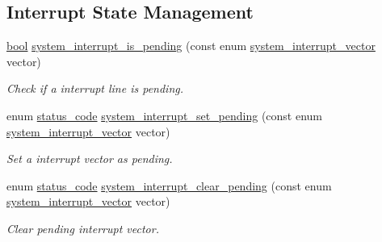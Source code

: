 \subsection*{Interrupt State Management}
\begin{DoxyCompactItemize}
\item 
\mbox{\hyperlink{group__group__sam0__utils_ga97a80ca1602ebf2303258971a2c938e2}{bool}} \mbox{\hyperlink{group__asfdoc__sam0__system__interrupt__group_ga08ea1ee1c7020c64e18a1673ca8548a4}{system\+\_\+interrupt\+\_\+is\+\_\+pending}} (const enum \mbox{\hyperlink{group__asfdoc__sam0__system__interrupt__group_ga43378e6222cc05290c1a0c6a9ba125cf}{system\+\_\+interrupt\+\_\+vector}} vector)
\begin{DoxyCompactList}\small\item\em Check if a interrupt line is pending. \end{DoxyCompactList}\item 
enum \mbox{\hyperlink{group__group__sam0__utils__status__codes_ga751c892e5a46b8e7d282085a5a5bf151}{status\+\_\+code}} \mbox{\hyperlink{group__asfdoc__sam0__system__interrupt__group_ga03184d235f73957b4226205219783ba3}{system\+\_\+interrupt\+\_\+set\+\_\+pending}} (const enum \mbox{\hyperlink{group__asfdoc__sam0__system__interrupt__group_ga43378e6222cc05290c1a0c6a9ba125cf}{system\+\_\+interrupt\+\_\+vector}} vector)
\begin{DoxyCompactList}\small\item\em Set a interrupt vector as pending. \end{DoxyCompactList}\item 
enum \mbox{\hyperlink{group__group__sam0__utils__status__codes_ga751c892e5a46b8e7d282085a5a5bf151}{status\+\_\+code}} \mbox{\hyperlink{group__asfdoc__sam0__system__interrupt__group_ga3c4191c58c9dda28890ec8153d8c83af}{system\+\_\+interrupt\+\_\+clear\+\_\+pending}} (const enum \mbox{\hyperlink{group__asfdoc__sam0__system__interrupt__group_ga43378e6222cc05290c1a0c6a9ba125cf}{system\+\_\+interrupt\+\_\+vector}} vector)
\begin{DoxyCompactList}\small\item\em Clear pending interrupt vector. \end{DoxyCompactList}\end{DoxyCompactItemize}
